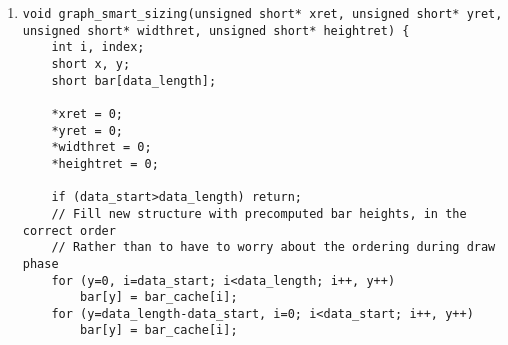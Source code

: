 \begin{enumerate}[label=\textbf{S.\arabic*},ref=S.\arabic*{ of Appendix A}]
\begin{adjustwidth}{-2em}{0pt}
\begin{lstlisting}
    if (clear)
        GRAPH_RESET();
    for (y=MAX_BAR_HEIGHT; y>0; y--) {
        for (x=0; x<GRAPH_WIDTH-(GRAPH_WIDTH%BAR_WIDTH)-data_length*BAR_WIDTH; x++) {
            GRAPH_PIXEL_OFF(x, y);
        }
        for (x=GRAPH_WIDTH-(GRAPH_WIDTH%BAR_WIDTH)-data_length*BAR_WIDTH, i=0; i<GRAPH_WIDTH-(GRAPH_WIDTH%BAR_WIDTH); i++, x++) {
            if ((i/BAR_WIDTH)>=data_length) break;
            index = (data_start+i/BAR_WIDTH)%data_length;
            if (bar[i/BAR_WIDTH]>=y)
                // Color the pixels based on glucose level (whether too high or too low)
                if (data[index]>=DISP_DANGER_HIGH)
                    GRAPH_PIXEL_DANGER(x, y);
                else if (data[index]>=DISP_WARNING_HIGH)
                    GRAPH_PIXEL_WARNING(x, y);
                else if (data[index]<=DISP_DANGER_LOW)
                    GRAPH_PIXEL_DANGER(x, y);
                else if (data[index]<=DISP_WARNING_LOW)
                    GRAPH_PIXEL_WARNING(x, y);
                else
                    GRAPH_PIXEL_ON(x, y);
            else
                GRAPH_PIXEL_OFF(x, y);
        }
    }
    is_changed = 0;
}
\end{lstlisting}
\end{adjustwidth}
\doublespacing

\item \label{graph_smart_sizing}
\begin{adjustwidth}{-2em}{0pt}
\singlespacing
\nl
\begin{lstlisting}
void graph_smart_sizing(unsigned short* xret, unsigned short* yret, unsigned short* widthret, unsigned short* heightret) {
    int i, index;
    short x, y;
    short bar[data_length];

    *xret = 0;
    *yret = 0;
    *widthret = 0;
    *heightret = 0;

    if (data_start>data_length) return;
    // Fill new structure with precomputed bar heights, in the correct order
    // Rather than to have to worry about the ordering during draw phase
    for (y=0, i=data_start; i<data_length; i++, y++)
        bar[y] = bar_cache[i];
    for (y=data_length-data_start, i=0; i<data_start; i++, y++)
        bar[y] = bar_cache[i];


\end{lstlisting}
\end{adjustwidth}
\end{enumerate}
